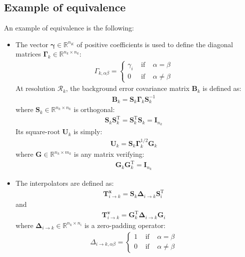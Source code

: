 \documentclass[12pt]{scrartcl}
\begin{document}
\subsection{Example of equivalence}
An example of equivalence is the following:
\begin{itemize}
\item The vector $\boldsymbol{\gamma} \in \mathbb{R}^{n_K}$ of positive coefficients is used to define the diagonal matrices $\boldsymbol{\Gamma}_k \in \mathbb{R}^{n_k \times n_k}$:
\begin{align}
\Gamma_{k,\alpha \beta} = \left\{
\begin{array}{ccc}
\gamma_i & \text{ if } & \alpha = \beta \\
0 & \text{ if } & \alpha \ne \beta
\end{array}\right.
\end{align}
At resolution $\mathcal{R}_k$, the background error covariance matrix $\mathbf{B}_k$ is defined as:
\begin{align}
\mathbf{B}_k = \mathbf{S}_k \boldsymbol{\Gamma}_k \mathbf{S}_k^{-1}
\end{align}
where $\mathbf{S}_k \in \mathbb{R}^{n_k \times n_k}$ is orthogonal:
\begin{align}
\mathbf{S}_k \mathbf{S}_k^\mathrm{T} = \mathbf{S}_k^\mathrm{T} \mathbf{S}_k = \mathbf{I}_{n_k}
\end{align}
Its square-root $\mathbf{U}_k$ is simply:
\begin{align}
\mathbf{U}_k = \mathbf{S}_k \boldsymbol{\Gamma}_k^{1/2} \mathbf{G}_k
\end{align}
where $\mathbf{G} \in \mathbb{R}^{n_k \times m_k}$ is any matrix verifying:
\begin{align}
\mathbf{G}_k \mathbf{G}_k^\mathrm{T} = \mathbf{I}_{n_k}
\end{align}
\item The interpolators are defined as: 
\begin{align}
\mathbf{T}^\mathbf{x}_{i \rightarrow k} = \mathbf{S}_k \boldsymbol{\Delta}_{i \rightarrow k} \mathbf{S}^\mathrm{T}_i
\end{align}
and
\begin{align}
\mathbf{T}^\mathbf{v}_{i \rightarrow k} = \mathbf{G}^\mathrm{T}_k \boldsymbol{\Delta}_{i \rightarrow k} \mathbf{G}_i
\end{align}
where $\boldsymbol{\Delta}_{i \rightarrow k} \in \mathbb{R}^{n_k \times n_i}$ is a zero-padding operator:
\begin{align}
\Delta_{i \rightarrow k, \alpha \beta} = \left\{
\begin{array}{ccc}
1 & \text{ if } & \alpha = \beta \\
0 & \text{ if } & \alpha \ne \beta
\end{array}\right.
\end{align}
\end{itemize}
\end{document}
